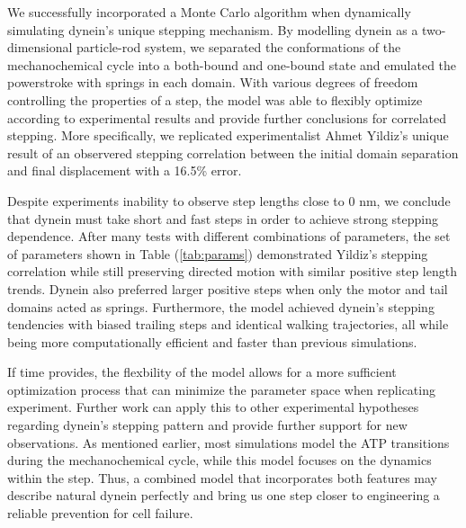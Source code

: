 

We successfully incorporated a Monte Carlo algorithm when dynamically simulating dynein's unique stepping mechanism. By modelling dynein as a two-dimensional particle-rod system, we separated the conformations of the mechanochemical cycle into a both-bound and one-bound state and emulated the powerstroke with springs in each domain. With various degrees of freedom controlling the properties of a step, the model was able to flexibly optimize according to experimental results and provide further conclusions for correlated stepping. More specifically, we replicated experimentalist Ahmet Yildiz's unique result of an observered stepping correlation between the initial domain separation and final displacement with a 16.5\% error.

Despite experiments inability to observe step lengths close to 0 nm, we conclude that dynein must take short and fast steps in order to achieve strong stepping dependence. After many tests with different combinations of parameters, the set of parameters shown in Table (\ref{tab:params}) demonstrated Yildiz's stepping correlation while still preserving directed motion with similar positive step length trends. Dynein also preferred larger positive steps when only the motor and tail domains acted as springs. Furthermore, the model achieved dynein's stepping tendencies with biased trailing steps and identical walking trajectories, all while being more computationally efficient and faster than previous simulations. 

If time provides, the flexbility of the model allows for a more sufficient optimization process that can minimize the parameter space when replicating experiment. Further work can apply this to other experimental hypotheses regarding dynein's stepping pattern and provide further support for new observations. As mentioned earlier, most simulations model the ATP transitions during the mechanochemical cycle, while this model focuses on the dynamics within the step. Thus, a combined model that incorporates both features may describe natural dynein perfectly and bring us one step closer to engineering a reliable prevention for cell failure. 

